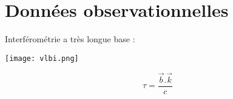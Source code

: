 \section{Données observationnelles}

\begin{frame}
  Interférométrie a très longue base : 
  \centerline{\texttt{[image: vlbi.png]}}
  $$ \tau = \frac{\vec{b}.\vec{k}}{c} $$
\end{frame}


